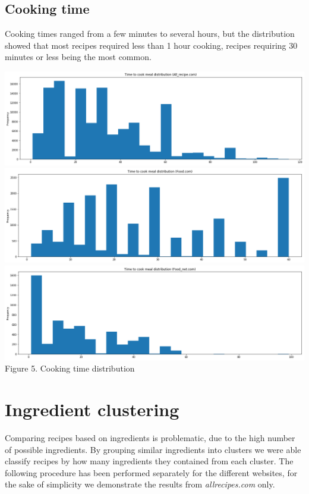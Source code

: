 \documentclass[11pt]{article}
\begin{document}
\subsection{Cooking time}

Cooking times ranged from a few minutes to several hours, but the distribution showed that most recipes required less than 1 hour cooking, recipes requiring 30 minutes or less being the most common.

\vspace{5mm}
\begin{center}
\includegraphics[scale=0.06]{cookingtime-1}
\includegraphics[scale=0.06]{cookingtime-2}
\includegraphics[scale=0.06]{cookingtime-3}
\label{cookingtime-dist} Figure 5. Cooking time distribution
\end{center}
\vspace{5mm}

\section{Ingredient clustering}

Comparing recipes based on ingredients is problematic, due to the high number of possible ingredients. By grouping similar ingredients into clusters we were able classify recipes by how many ingredients they contained from each cluster. The following procedure has been performed separately for the different websites, for the sake of simplicity we demonstrate the results from \textit{allrecipes.com} only.
\end{document}
